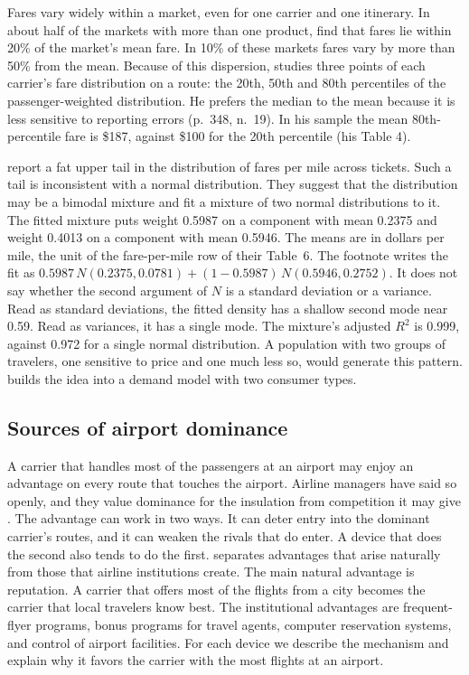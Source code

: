 Fares vary widely within a market, even for one carrier and one itinerary. In about half of the markets with
more than one product, \citet[p.~19]{BerryCarnallSpiller2006} find that fares lie within 20\% of the market's
mean fare. In 10\% of these markets fares vary by more than 50\% from the mean. Because of this dispersion,
\citet{Borenstein1989} studies three points of each carrier's fare distribution on a route: the 20th, 50th
and 80th percentiles of the passenger-weighted distribution. He prefers the median to the mean because it is
less sensitive to reporting errors (p.~348, n.~19). In his sample the mean 80th-percentile fare is \$187,
against \$100 for the 20th percentile (his Table 4).

\citet[pp.~10--11, n.~10]{BerryCarnallSpiller2006} report a fat upper tail in the distribution of fares per
mile across tickets. Such a tail is inconsistent with a normal distribution. They suggest that the
distribution may be a bimodal mixture and fit a mixture of two normal distributions to it. The fitted
mixture puts weight 0.5987 on a component with mean 0.2375 and weight 0.4013 on a component with mean 0.5946.
The means are in dollars per mile, the unit of the fare-per-mile row of their Table~6. The footnote writes the
fit as $0.5987\,N(0.2375, 0.0781) + (1-0.5987)\,N(0.5946, 0.2752)$. It does not say whether the second argument of
$N$ is a standard deviation or a variance. Read as standard deviations, the fitted density has a shallow second
mode near 0.59. Read as variances, it has a single mode. The mixture's adjusted $R^2$ is 0.999, against 0.972
for a single normal distribution. A population with two groups of
travelers, one sensitive to price and one much less so, would generate this pattern. 
builds the idea into a demand model with two consumer types.

\subsection{Sources of airport dominance}\label{sec:09-dominance-sources}

A carrier that handles most of the passengers at an airport may enjoy an advantage on every route that touches
the airport. Airline managers have said so openly, and they value dominance for the insulation from
competition it may give \citep[p.~345]{Borenstein1989}. The advantage can work in two ways. It can deter entry
into the dominant carrier's routes, and it can weaken the rivals that do enter. A device that does the second
also tends to do the first. \citet[p.~345]{Borenstein1989} separates advantages that arise naturally from
those that airline institutions create. The main natural advantage is reputation. A carrier that offers most
of the flights from a city becomes the carrier that local travelers know best. The institutional advantages
are frequent-flyer programs, bonus programs for travel agents, computer reservation systems, and control of
airport facilities. For each device we describe the mechanism and explain why it favors the carrier with the
most flights at an airport.


